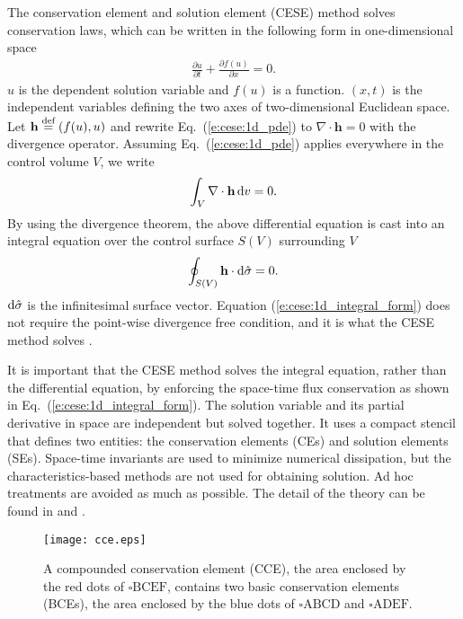 \documentclass{turgon}
\begin{document}
The conservation element and solution element (CESE) method solves conservation
laws, which can be written in the following form in one-dimensional space
\begin{align}
  \frac{\partial u}{\partial t} + \frac{\partial f(u)}{\partial x} = 0
  .
  \label{e:cese:1d_pde}
\end{align}
$u$ is the dependent solution variable and $f(u)$ is a function.  $(x, t)$ is
the independent variables defining the two axes of two-dimensional Euclidean
space.  Let $\mathbf{h} \defeq (f(u),u)$ and rewrite Eq.~(\ref{e:cese:1d_pde})
to $\nabla\cdot\mathbf{h} = 0$ with the divergence operator.  Assuming
Eq.~(\ref{e:cese:1d_pde}) applies everywhere in the control volume $V$, we
write
\begin{align*}
  \int_V\nabla\cdot\mathbf{h}\mathop{}\!\mathrm{d} v = 0
  .
\end{align*}
By using the divergence theorem, the above differential equation is cast into
an integral equation over the control surface $S(V)$ surrounding $V$
\begin{align}
  \oint_{S(V)}\mathbf{h}\cdot\mathop{}\!\mathrm{d}\hat{\sigma} = 0
  .  \label{e:cese:1d_integral_form}
\end{align}
$\mathop{}\!\mathrm{d}\hat{\sigma}$ is the infinitesimal surface vector.  Equation
(\ref{e:cese:1d_integral_form}) does not require the point-wise divergence free
condition, and it is what the CESE method solves \citep{chang_method_1995}.

It is important that the CESE method solves the integral equation, rather than
the differential equation, by enforcing the space-time flux conservation as
shown in Eq.~(\ref{e:cese:1d_integral_form}).  The solution variable and its
partial derivative in space are independent but solved together.  It uses a
compact stencil that defines two entities: the conservation elements (CEs) and
solution elements (SEs).  Space-time invariants are used to minimize numerical
dissipation, but the characteristics-based methods are not used for obtaining
solution.  Ad hoc treatments are avoided as much as possible.  The detail of
the theory can be found in \cite{chang_new_1991} and \cite{chang_method_1995}.

\begin{figure}[htbp]
\centering
  \texttt{[image: cce.eps]}
  \caption{A compounded conservation element (CCE), the area enclosed by the
  {\color{red} red} dots of {\color{red} $\square\mathrm{BCEF}$}, contains two
  basic conservation elements (BCEs), the area enclosed by the {\color{blue}
  blue} dots of {\color{blue} $\square\mathrm{ABCD}$} and {\color{blue}
  $\square\mathrm{ADEF}$}.}
  \label{f:cce}
\end{figure}
\end{document}
